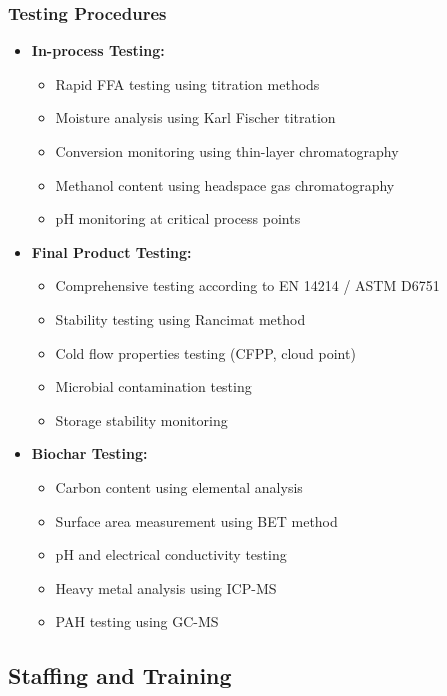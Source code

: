 \subsubsection{Testing Procedures}
\begin{itemize}
    \item \textbf{In-process Testing:}
    \begin{itemize}
        \item Rapid FFA testing using titration methods
        \item Moisture analysis using Karl Fischer titration
        \item Conversion monitoring using thin-layer chromatography
        \item Methanol content using headspace gas chromatography
        \item pH monitoring at critical process points
    \end{itemize}
    
    \item \textbf{Final Product Testing:}
    \begin{itemize}
        \item Comprehensive testing according to EN 14214 / ASTM D6751
        \item Stability testing using Rancimat method
        \item Cold flow properties testing (CFPP, cloud point)
        \item Microbial contamination testing
        \item Storage stability monitoring
    \end{itemize}
    
    \item \textbf{Biochar Testing:}
    \begin{itemize}
        \item Carbon content using elemental analysis
        \item Surface area measurement using BET method
        \item pH and electrical conductivity testing
        \item Heavy metal analysis using ICP-MS
        \item PAH testing using GC-MS
    \end{itemize}
\end{itemize}

\subsection{Staffing and Training}

